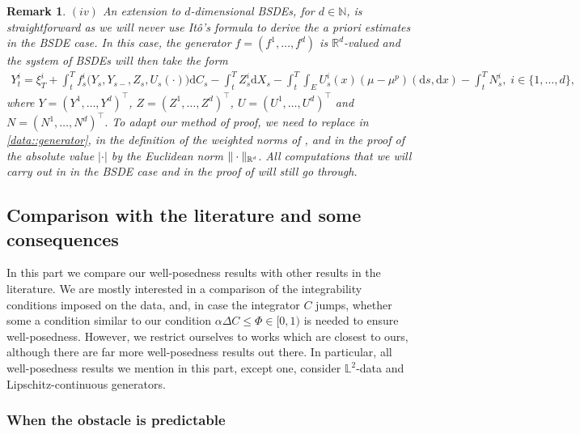 \documentclass[10pt]{article} %
\newtheorem{remark}[theorem]{Remark}
\newcommand{\smalltext}[1]{\text{\fontsize{4}{4}\selectfont$#1$}}
\def \L{\mathbb{L}}
\def \N{\mathbb{N}}
\def \R{\mathbb{R}}
\newcommand{\1}{\mathbf{1}}
\def\d{\mathrm{d}}
\begin{document}
\begin{remark}
	\medskip
	$(iv)$ An extension to $d$-dimensional {\rm BSDEs}, for $d \in \N$, is straightforward as we will never use It\^o's formula to derive the \emph{a priori} estimates in the {\rm BSDE} case. In this case, the generator $f = (f^1,\ldots,f^d)$ is $\R^d$-valued and the system of {\rm BSDEs} will then take the form
		\begin{align*}
			Y^i_t = \xi^i_T + \int_t^T f^i_s\big(Y_s, Y_{s-}, Z_s, U_s(\cdot)\big) \d C_s - \int_t^T Z^i_s \d X_s - \int_t^T\int_E U^i_s(x)(\mu-\mu^p)(\d s,\d x) - \int_t^T N^i_s,\; i\in\{1,\dots,d\}, 
		\end{align*}
		where $Y = (Y^1,\ldots,Y^d)^\top$, $Z = (Z^1,\ldots,Z^d)^\top$, $U = (U^1,\ldots,U^d)^\top$ and $N = (N^1,\ldots,N^d)^\top$. To adapt our method of proof, we need to replace in \ref{data::generator}, in the definition of the weighted norms of {\rm{}}, and in the proof of {\rm{}} the absolute value $|\cdot|$ by the Euclidean norm $\|\cdot\|_{\R^\smalltext{d}}$. All computations that we will carry out in {\rm{}} in the {\rm BSDE} case and in the proof of {\rm{}} will still go through.
\end{remark}



\subsection{Comparison with the literature and some consequences}\label{sec::comparison_literature}


In this part we compare our well-posedness results with other results in the literature. We are mostly interested in a comparison of the integrability conditions imposed on the data, and, in case the integrator $C$ jumps, whether some a condition similar to our condition $\alpha\Delta C \leq \Phi \in [0,1)$ is needed to ensure well-posedness. However, we restrict ourselves to works which are closest to ours, although there are far more well-posedness results out there. In particular, all well-posedness results we mention in this part, except one, consider $\L^2$-data and Lipschitz-continuous generators.


\subsubsection{When the obstacle is predictable}
\end{document}
